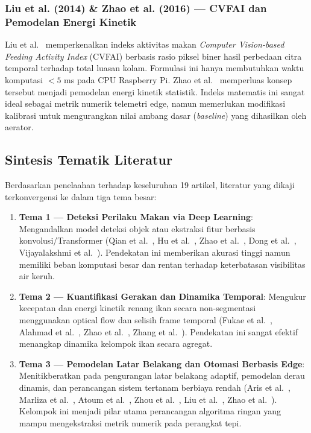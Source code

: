 \subsubsection{Liu et al. (2014) \& Zhao et al. (2016) --- CVFAI dan Pemodelan Energi Kinetik}
Liu et al.~\cite{Liu2014} memperkenalkan indeks aktivitas makan \textit{Computer Vision-based Feeding Activity Index} (CVFAI) berbasis rasio piksel biner hasil perbedaan citra temporal terhadap total luasan kolam. Formulasi ini hanya membutuhkan waktu komputasi $<5$ ms pada CPU Raspberry Pi. Zhao et al.~\cite{Zhao2016} memperluas konsep tersebut menjadi pemodelan energi kinetik statistik. Indeks matematis ini sangat ideal sebagai metrik numerik telemetri edge, namun memerlukan modifikasi kalibrasi untuk mengurangkan nilai ambang dasar (\textit{baseline}) yang dihasilkan oleh aerator.

\subsection{Sintesis Tematik Literatur}
Berdasarkan penelaahan terhadap keseluruhan 19 artikel, literatur yang dikaji terkonvergensi ke dalam tiga tema besar:
\begin{enumerate}
    \item \textbf{Tema 1 --- Deteksi Perilaku Makan via Deep Learning}: Mengandalkan model deteksi objek atau ekstraksi fitur berbasis konvolusi/Transformer (Qian et al.~\cite{Qian2025}, Hu et al.~\cite{Hu2026}, Zhao et al.~\cite{Zhao2025}, Dong et al.~\cite{Dong2024}, Vijayalakshmi et al.~\cite{Vijayalakshmi2025}). Pendekatan ini memberikan akurasi tinggi namun memiliki beban komputasi besar dan rentan terhadap keterbatasan visibilitas air keruh.
    \item \textbf{Tema 2 --- Kuantifikasi Gerakan dan Dinamika Temporal}: Mengukur kecepatan dan energi kinetik renang ikan secara non-segmentasi menggunakan optical flow dan selisih frame temporal (Fukae et al.~\cite{Fukae2023}, Alahmad et al.~\cite{Alahmad2025}, Zhao et al.~\cite{Zhao2016}, Zhang et al.~\cite{Zhang2024}). Pendekatan ini sangat efektif menangkap dinamika kelompok ikan secara agregat.
    \item \textbf{Tema 3 --- Pemodelan Latar Belakang dan Otomasi Berbasis Edge}: Menitikberatkan pada pengurangan latar belakang adaptif, pemodelan derau dinamis, dan perancangan sistem tertanam berbiaya rendah (Aris et al.~\cite{Aris2023}, Marliza et al.~\cite{Marliza2021}, Atoum et al.~\cite{Atoum2015}, Zhou et al.~\cite{Zhou2018}, Liu et al.~\cite{Liu2014}, Zhao et al.~\cite{Zhao2017}). Kelompok ini menjadi pilar utama perancangan algoritma ringan yang mampu mengekstraksi metrik numerik pada perangkat tepi.
\end{enumerate}
